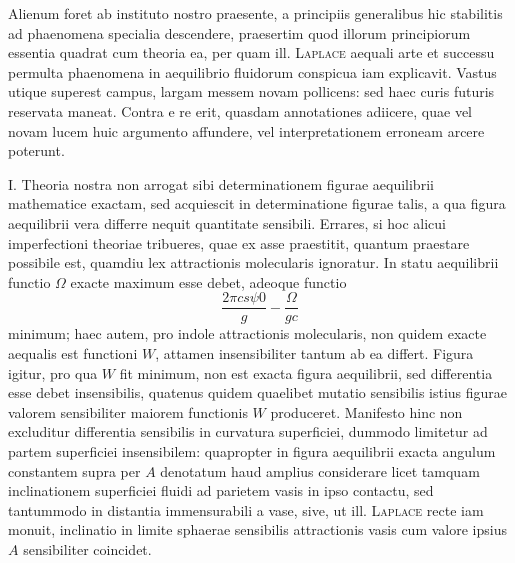 Alienum foret ab instituto nostro praesente, a principiis generalibus hic stabilitis ad phaenomena specialia descendere, praesertim quod illorum principiorum essentia quadrat cum theoria ea, per quam ill. \textsc{Laplace} aequali arte et successu permulta phaenomena in aequilibrio fluidorum conspicua iam explicavit. Vastus utique superest campus, largam messem novam pollicens: sed haec curis futuris reservata maneat. Contra e re erit, quasdam annotationes adiicere, quae vel novam lucem huic argumento affundere, vel interpretationem erroneam arcere poterunt.

I. Theoria nostra non arrogat sibi determinationem figurae aequilibrii mathematice exactam, sed acquiescit in determinatione figurae talis, a qua figura aequilibrii vera differre nequit quantitate sensibili. Errares, si hoc alicui imperfectioni theoriae tribueres, quae ex asse praestitit, quantum praestare possibile est, quamdiu lex attractionis molecularis ignoratur. In statu aequilibrii functio $\Omega$ exacte maximum esse debet, adeoque functio
\[
\frac{2\pi cs\psi0}g-\frac\Omega{gc}
\]
minimum; haec autem, pro indole attractionis molecularis, non quidem exacte aequalis est functioni $W$, attamen insensibiliter tantum ab ea differt. Figura igitur, pro qua $W$ fit minimum, non est exacta figura aequilibrii, sed differentia esse debet insensibilis, quatenus quidem quaelibet mutatio sensibilis istius figurae valorem sensibiliter maiorem functionis $W$ produceret. Manifesto hinc non excluditur differentia sensibilis in curvatura superficiei, dummodo limitetur ad partem superficiei insensibilem: quapropter in figura aequilibrii exacta angulum constantem supra per $A$ denotatum haud amplius considerare licet tamquam inclinationem superficiei fluidi ad parietem vasis in ipso contactu, sed tantummodo in distantia immensurabili a vase, sive, ut ill. \textsc{Laplace} recte iam monuit, inclinatio in limite sphaerae sensibilis attractionis vasis cum valore ipsius $A$ sensibiliter coincidet.

